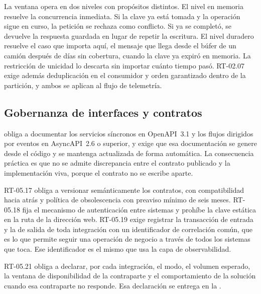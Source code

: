 La ventana opera en dos niveles con propósitos distintos. El nivel en memoria resuelve la concurrencia
inmediata. Si la clave ya está tomada y la operación sigue en curso, la petición se rechaza como
conflicto. Si ya se completó, se devuelve la respuesta guardada en lugar de repetir la escritura. El
nivel duradero resuelve el caso que importa aquí, el mensaje que llega desde el búfer de un camión
después de días sin cobertura, cuando la clave ya expiró en memoria. La restricción de unicidad lo
descarta sin importar cuánto tiempo pasó. RT-02.07 exige además deduplicación en el consumidor y orden
garantizado dentro de la partición, y ambos se aplican al flujo de telemetría.

\subsection{Gobernanza de interfaces y contratos}\label{sec:4-interfaces}

 obliga a documentar los servicios síncronos en OpenAPI~3.1 y los flujos dirigidos
por eventos en AsyncAPI~2.6 o superior, y exige que esa documentación se genere desde el código y se
mantenga actualizada de forma automática. La consecuencia práctica es que no se admite discrepancia
entre el contrato publicado y la implementación viva, porque el contrato no se escribe aparte.

RT-05.17 obliga a versionar semánticamente los contratos, con compatibilidad hacia atrás y política de
obsolescencia con preaviso mínimo de seis meses. RT-05.18 fija el mecanismo de autenticación entre
sistemas y prohíbe la clave estática en la ruta de la dirección web. RT-05.19 exige registrar la
transacción de entrada y la de salida de toda integración con un identificador de correlación común,
que es lo que permite seguir una operación de negocio a través de todos los sistemas que toca. Ese
identificador es el mismo que usa la capa de observabilidad.

RT-05.21 obliga a declarar, por cada integración, el modo, el volumen esperado, la ventana de
disponibilidad de la contraparte y el comportamiento de la solución cuando esa contraparte no
responde. Esa declaración se entrega en la .

